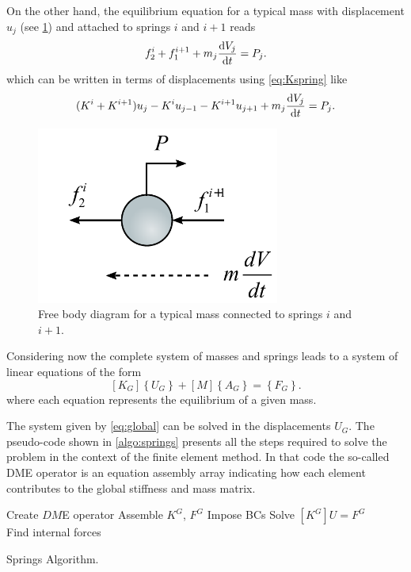 On the other hand, the equilibrium equation for a typical mass with displacement $u_j$  (see \cref{fig:dclmass}) and attached to springs $i$ and $i+1$ reads
\begin{equation}
f_2^i + f_1^{i + 1} + m_j \dv{V_j}{t} = P_j.
\label{eq:equilmass}
\end{equation}
which can be written in terms of displacements using \cref{eq:Kspring} like
\[(K^i + K^{i + 1}) u_j - K^i u_{j - 1} - K^{i + 1} u_{j + 1} + m_j\dv{V_j}{t} = P_j .\]


\begin{figure}[H]
\centering
\includegraphics[width=8cm]{dcl_mass.pdf}
\caption{Free body diagram for a typical mass connected to springs $i$ and $i+1$.}
\label{fig:dclmass}
\end{figure}

Considering now the complete system of masses and springs leads to a system of linear equations of the form
\begin{equation}
\left[ {{K_G}} \right]\left\{ {{U_G}} \right\} + \left[ M \right]\left\{ {{A_G}} \right\} = \left\{ {{F_G}} \right\}.
\label{eq:global}
\end{equation}
where each equation represents the equilibrium of a given mass.

The system given by \cref{eq:global} can be solved in the displacements $U_G$. The pseudo-code shown in \cref{algo:springs} presents all the steps required to solve the problem in the context of the finite element method. In that code the so-called DME operator is an equation assembly array indicating how each element contributes to the global stiffness and mass matrix.

\begin{algorithm}[H]\label{algo:springs}
    \SetAlgoLined
    Create $DM$E operator\;
    Assemble $K^G$, $F^G$\;
    Impose BCs\;
    Solve $[K^G]U=F^G$\\
    Find internal forces
    \caption{Springs Algorithm.}    
\end{algorithm}


